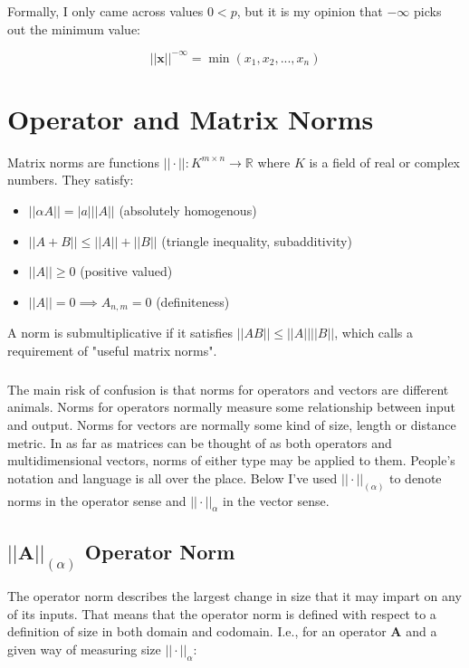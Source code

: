 Formally, I only came across values $0<p$, but it is my opinion that $-\infty$ picks out the minimum value:

\begin{equation}
||\mathbf{x}||^{-\infty} = \min(x_1,x_2,...,x_n)
\end{equation}




\section{Operator and Matrix Norms}
\label{sec:norms}

Matrix norms are functions $||\cdot||: K^{m\times n} \rightarrow \mathbb{R}$ where $K$ is a field of real or complex numbers. They satisfy:

\begin{itemize}
\item $||\alpha A|| = |a| ||A||$ (absolutely homogenous)
\item $||A+B|| \leq ||A|| + ||B||$ (triangle inequality, subadditivity)
\item $||A||\geq 0$ (positive valued)
\item $||A||=0 \implies A_{n,m}=0$ (definiteness)
\end{itemize}

A norm is submultiplicative if it satisfies $||AB||\leq||A||||B||$, which  calls a requirement of "useful matrix norms".

\subparagraph{} 
The main risk of confusion is that norms for operators and vectors are different animals. Norms for operators normally measure some relationship between input and output. Norms for vectors are normally some kind of size, length or distance metric. In as far as matrices can be thought of as both operators and multidimensional vectors, norms of either type may be applied to them. People's notation and language is all over the place. Below I've used $||\cdot||_{(\alpha)}$ to denote norms in the operator sense and $||\cdot||_{\alpha}$ in the vector sense. 

\subsection{$||\mathbf{A}||_{(\alpha)}$ Operator Norm}
\label{sec:operatornorm}
The operator norm describes the largest change in size that it may impart on any of its inputs. That means that the operator norm is defined with respect to a definition of size in both domain and codomain. I.e., for an operator $\mathbf{A}$ and a given way of measuring size $||\cdot||_{\alpha}$:

